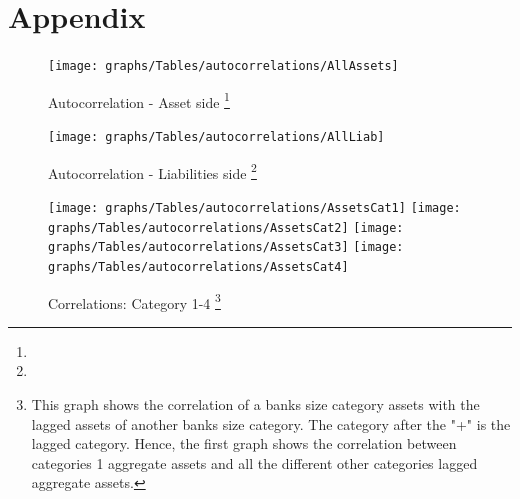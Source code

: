 \documentclass[12pt, a4paper]{article} %
\begin{document}

\newpage
\printbibliography[
heading=bibintoc,
title={Bibliography}
]

\newpage




\appendix
\section{Appendix}

\begin{figure}[hbtp]
\begin{minipage}{\textwidth}

\centering
\caption[1]{Autocorrelation - Asset side \footnote{} }
\texttt{[image: graphs/Tables/autocorrelations/AllAssets]}
\label{fig:share_both}

\end{minipage}
\end{figure}

\begin{figure}[hbtp]
\begin{minipage}{\textwidth}

\centering
\caption[1]{Autocorrelation - Liabilities side \footnote{} }
\texttt{[image: graphs/Tables/autocorrelations/AllLiab]}
\label{fig:share_both}

\end{minipage}
\end{figure}




\begin{figure}[hbtp]
\begin{minipage}{\textwidth}
\centering
\caption[1]{Correlations: Category 1-4 \footnote{This graph shows the correlation of a banks size category assets with the lagged assets of another banks size category. The category after the "+" is the lagged category. Hence, the first graph shows the correlation between categories 1 aggregate assets and all the different other categories lagged aggregate assets.}}
\texttt{[image: graphs/Tables/autocorrelations/AssetsCat1]}
\texttt{[image: graphs/Tables/autocorrelations/AssetsCat2]}
\texttt{[image: graphs/Tables/autocorrelations/AssetsCat3]}
\texttt{[image: graphs/Tables/autocorrelations/AssetsCat4]}
\label{autocorrelationsCat14}
\end{minipage}
\end{figure}
\end{document}
